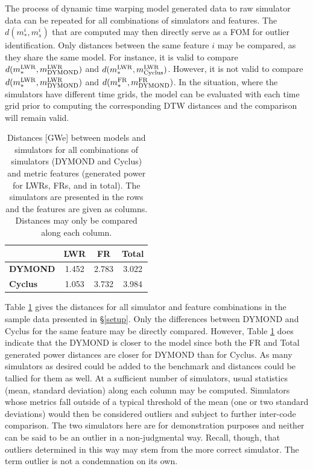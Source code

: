 The process of dynamic time warping model generated data to raw simulator data can be 
repeated for all combinations of simulators and features. The 
$d(m_*^i, m_s^i)$ that are computed may then directly serve as a FOM for
outlier identification. Only distances between the same feature $i$ may be compared,
as they share the same model. For instance, it is valid to compare
$d(m_*^{\mathrm{LWR}}, m_{\mathrm{DYMOND}}^{\mathrm{LWR}})$ and $d(m_*^{\mathrm{LWR}}, m_{\mathrm{Cyclus}}^{\mathrm{LWR}})$. However,  
it is not valid to compare $d(m_*^{\mathrm{LWR}}, m_{\mathrm{DYMOND}}^{\mathrm{LWR}})$ and 
$d(m_*^{\mathrm{FR}}, m_{\mathrm{DYMOND}}^{\mathrm{FR}})$.  In the situation, where the simulators 
have different time grids, the model can be evaluated with each time grid
prior to computing the corresponding DTW distances and the comparison will
remain valid.

\begin{table}[htb]
\centering
\caption{Distances [GWe] between models and simulators for all combinations of 
simulators (DYMOND and Cyclus) and metric features (generated power for 
LWRs, FRs, and in total). The simulators are presented in the rows and the
features are given as columns. Distances may only be compared along 
each column.}
\label{d-compare}
\begin{tabular}{l||c||c||c|}
                & \textbf{LWR} & \textbf{FR} & \textbf{Total} \\
\hline
\textbf{DYMOND} & 1.452        & 2.783       & 3.022          \\
\hline
\textbf{Cyclus} & 1.053        & 3.732       & 3.984          \\
\hline
\end{tabular}
\end{table}

Table \ref{d-compare} gives the distances for all simulator and feature 
combinations in the sample data presented in \S\ref{setup}. Only the differences between DYMOND and 
Cyclus for the same feature may be directly compared.  However, Table \ref{d-compare} 
does indicate that the DYMOND is closer to the model since both the FR and Total
generated power distances are closer for DYMOND than for Cyclus.  As many
simulators as desired could be added to the benchmark and distances could 
be tallied for them as well. At a sufficient number of simulators, usual 
statistics (mean, standard deviation) along each column may be computed.
Simulators whose metrics fall outside of a typical threshold of the mean
(one or two standard deviations) would then be considered outliers and 
subject to further inter-code comparison. The two simulators here are 
for demonstration purposes and neither can be said to be an outlier in a
non-judgmental way. Recall, though, that outliers determined in this way 
may stem from the more correct simulator. The term outlier is not a 
condemnation on its own.

